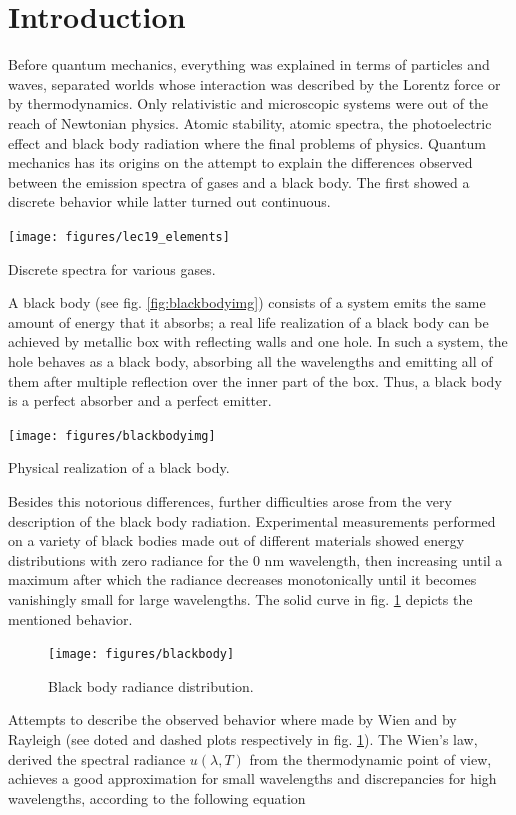 \documentclass{article}
\begin{document}
\section{Introduction}
Before quantum mechanics, everything was explained in terms of particles and waves, separated worlds whose interaction was described by the Lorentz force or by thermodynamics. Only relativistic and microscopic systems were out of the reach of Newtonian physics. Atomic stability, atomic spectra, the photoelectric effect and black body radiation where the final problems of physics. Quantum mechanics has its origins on the attempt to explain the differences observed between the emission spectra of gases and a black body. The first showed a discrete behavior while latter turned out continuous. 
\begin{marginfigure}%
  \texttt{[image: figures/lec19\_elements]}
  \caption{Discrete spectra for various gases.}
  \label{fig:gasesspect}
\end{marginfigure}
A black body (see fig. \ref{fig:blackbodyimg}) consists of a system emits the same amount of energy that it absorbs; a real life realization of a black body can be achieved by metallic box with reflecting walls and one hole. In such a system, the hole behaves as a black body, absorbing all the wavelengths and emitting all of them after multiple reflection over the inner part of the box. Thus, a black body is a perfect absorber and a perfect emitter.
\begin{marginfigure}%
  \texttt{[image: figures/blackbodyimg]}
  \caption{Physical realization of a black body.}
  \label{fig:blackbodyimg}
\end{marginfigure}
Besides this notorious differences, further difficulties arose from the very description of the black body radiation. Experimental measurements performed on a variety of black bodies made out of different materials showed energy distributions with zero radiance for the 0 nm wavelength, then increasing until a maximum after which the radiance decreases monotonically until it becomes vanishingly small for large wavelengths. The solid curve in fig. \ref{fig:blackbodyrad} depicts the mentioned behavior.
\begin{figure}%
  \texttt{[image: figures/blackbody]}
  \caption{Black body radiance distribution.}
  \label{fig:blackbodyrad}
\end{figure}
Attempts to describe the observed behavior where made by Wien and by Rayleigh (see doted and dashed plots respectively in fig. \ref{fig:blackbodyrad}). The Wien's law, derived the spectral radiance $u(\lambda,T)$ from the thermodynamic point of view, achieves a good approximation for small wavelengths and discrepancies for high wavelengths, according to the following equation
\end{document}
